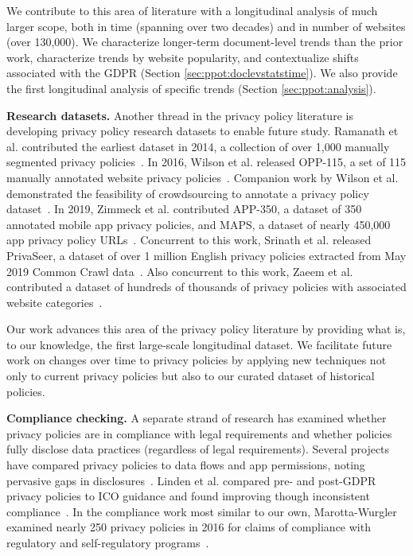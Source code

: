 We contribute to this area of literature with a longitudinal analysis of much larger scope, both in time (spanning over two decades) and in number of websites (over 130,000). We characterize longer-term document-level trends than the prior work, characterize trends by website popularity, and contextualize shifts associated with the GDPR (Section \ref{sec:ppot:doclevstatstime}). We also provide the first longitudinal analysis of specific trends (Section \ref{sec:ppot:analysis}).

\textbf{Research datasets.}
Another thread in the privacy policy literature is developing privacy policy research datasets to enable future study. Ramanath et al. contributed the earliest dataset in 2014, a collection of over 1,000 manually segmented privacy policies~\cite{ramanath2014unsupervised}. In 2016, Wilson et al. released OPP-115, a set of 115 manually annotated website privacy policies~\cite{wilson2016creation}. Companion work by Wilson et al. demonstrated the feasibility of crowdsourcing to annotate a privacy policy dataset~\cite{wilson2016crowdsourcing}. In 2019, Zimmeck et al. contributed APP-350, a dataset of 350 annotated mobile app privacy policies, and MAPS, a dataset of nearly 450,000 app privacy policy URLs~\cite{zimmeck2019}. Concurrent to this work, Srinath et al. released PrivaSeer, a dataset of over 1 million English privacy policies extracted from May 2019 Common Crawl data~\cite{srinath2020}. Also concurrent to this work, Zaeem et al. contributed a dataset of hundreds of thousands of privacy policies with associated website categories~\cite{zaeemlarge}.

Our work advances this area of the privacy policy literature by providing what is, to our knowledge, the first large-scale longitudinal dataset. We facilitate future work on changes over time to privacy policies by applying new techniques not only to current privacy policies but also to our curated dataset of historical policies.

\textbf{Compliance checking.}
A separate strand of research has examined whether privacy policies are in compliance with legal requirements and whether policies fully disclose data practices (regardless of legal requirements). Several projects have compared privacy policies to data flows and app permissions, noting pervasive gaps in disclosures~\cite{slavin2016, zimmeck2019}. Linden et al. compared pre- and post-GDPR privacy policies to ICO guidance and found improving though inconsistent compliance~\cite{linden2020privacy}. In the compliance work most similar to our own, Marotta-Wurgler examined nearly 250 privacy policies in 2016 for claims of compliance with regulatory and self-regulatory programs~\cite{marotta-wurgler2016}.


